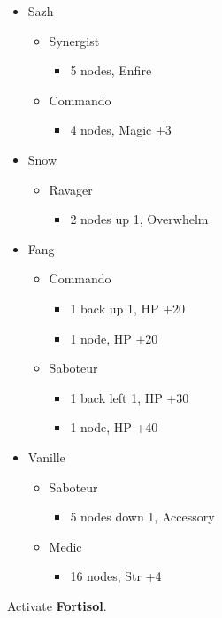 \begin{menu}
\begin{itemize}
    \crystarium
    \begin{itemize}
        \item Sazh
        \begin{itemize}
            \item Synergist
            \begin{itemize}
                \item 5 nodes, Enfire
            \end{itemize}
            \item Commando
            \begin{itemize}
                \item 4 nodes, Magic +3
            \end{itemize}
        \end{itemize}
        \item Snow
        \begin{itemize}
            \item Ravager
            \begin{itemize}
                \item 2 nodes up 1, Overwhelm
            \end{itemize}
        \end{itemize}
        \item Fang
        \begin{itemize}
            \item Commando
            \begin{itemize}
                \item 1 back up 1, HP +20
                \item 1 node, HP +20
            \end{itemize}
            \item Saboteur
            \begin{itemize}
                \item 1 back left 1, HP +30
                \item 1 node, HP +40
            \end{itemize}
        \end{itemize}
        \item Vanille
        \begin{itemize}
            \item Saboteur
            \begin{itemize}
                \item 5 nodes down 1, Accessory
            \end{itemize}
            \item Medic
            \begin{itemize}
                \item 16 nodes, Str +4
            \end{itemize}
        \end{itemize}
    \end{itemize}
    
\end{itemize}
\end{menu}
 Activate \textbf{Fortisol}.

